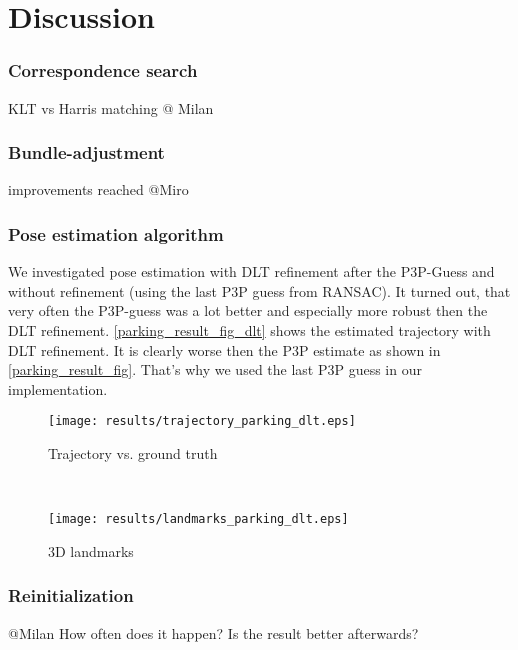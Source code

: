 \section{Discussion}

\subsubsection{Correspondence search}
KLT vs Harris matching
\textcolor[rgb]{1,0,0}{@ Milan}

\subsubsection{Bundle-adjustment}
improvements reached
\textcolor[rgb]{1,0,0}{@Miro}

\subsubsection{Pose estimation algorithm}
We investigated pose estimation with DLT refinement after the P3P-Guess and without refinement (using the last P3P guess from RANSAC). It turned out, that very often the P3P-guess was a lot better and especially more robust then the DLT refinement. \cref{parking_result_fig_dlt} shows the estimated trajectory with DLT refinement. It is clearly worse then the P3P estimate as shown in \cref{parking_result_fig}. That's why we used the last P3P guess in our implementation.
\begin{figure*}[ht!]
    \centering
    \begin{subfigure}[t]{0.5\textwidth}
        \centering
        \texttt{[image: results/trajectory\_parking\_dlt.eps]} 
        \caption{Trajectory vs. ground truth}
    \end{subfigure}%
    ~ 
    \begin{subfigure}[t]{0.5\textwidth}
        \centering
        \texttt{[image: results/landmarks\_parking\_dlt.eps]}
        \caption{3D landmarks}
    \end{subfigure}
    \caption{Parking dataset results with DLT refinement}
		\label{parking_result_fig_dlt}
\end{figure*}

\subsubsection{Reinitialization}
\textcolor[rgb]{1,0,0}{@Milan}
How often does it happen? Is the result better afterwards?

